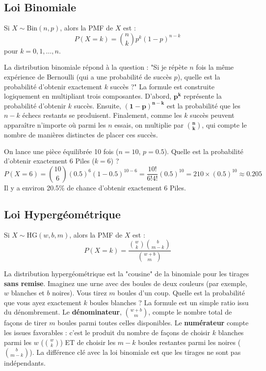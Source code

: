 \subsection{Loi Binomiale}

\begin{theorembox}
Si $X \sim \text{Bin}(n, p)$, alors la PMF de $X$ est :
$$ P(X=k) = \binom{n}{k} p^k (1-p)^{n-k} $$
pour $k = 0, 1, \dots, n$.
\end{theorembox}

\begin{intuitionbox}
La distribution binomiale répond à la question : "Si je répète $n$ fois la même expérience de Bernoulli (qui a une probabilité de succès $p$), quelle est la probabilité d'obtenir exactement $k$ succès ?"
La formule est construite logiquement en multipliant trois composantes. D'abord, $\mathbf{p^k}$ représente la probabilité d'obtenir $k$ succès. Ensuite, $\mathbf{(1-p)^{n-k}}$ est la probabilité que les $n-k$ échecs restants se produisent. Finalement, comme les $k$ succès peuvent apparaître n'importe où parmi les $n$ essais, on multiplie par $\mathbf{\binom{n}{k}}$, qui compte le nombre de manières distinctes de placer ces succès.
\end{intuitionbox}

\begin{examplebox}
On lance une pièce équilibrée 10 fois ($n=10$, $p=0.5$). Quelle est la probabilité d'obtenir exactement 6 Piles ($k=6$) ?
$$ P(X=6) = \binom{10}{6} (0.5)^6 (1-0.5)^{10-6} = \frac{10!}{6!4!} (0.5)^{10} = 210 \times (0.5)^{10} \approx 0.205 $$
Il y a environ 20.5\% de chance d'obtenir exactement 6 Piles.
\end{examplebox}

\subsection{Loi Hypergéométrique}

\begin{theorembox}
Si $X \sim \text{HG}(w, b, m)$, alors la PMF de $X$ est :
$$ P(X=k) = \frac{\binom{w}{k} \binom{b}{m-k}}{\binom{w+b}{m}} $$
\end{theorembox}

\begin{intuitionbox}
La distribution hypergéométrique est la "cousine" de la binomiale pour les tirages \textbf{sans remise}. Imaginez une urne avec des boules de deux couleurs (par exemple, $w$ blanches et $b$ noires). Vous tirez $m$ boules d'un coup. Quelle est la probabilité que vous ayez exactement $k$ boules blanches ?
La formule est un simple ratio issu du dénombrement. Le \textbf{dénominateur}, $\binom{w+b}{m}$, compte le nombre total de façons de tirer $m$ boules parmi toutes celles disponibles. Le \textbf{numérateur} compte les issues favorables : c'est le produit du nombre de façons de choisir $k$ blanches parmi les $w$ ($\binom{w}{k}$) ET de choisir les $m-k$ boules restantes parmi les noires ($\binom{b}{m-k}$). La différence clé avec la loi binomiale est que les tirages ne sont pas indépendants.
\end{intuitionbox}

